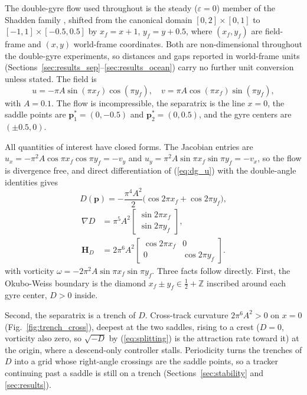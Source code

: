 \documentclass[lettersize,journal]{IEEEtran}
\begin{document}
The double-gyre flow used throughout is the steady ($\varepsilon = 0$)
member of the Shadden family \cite{15}, shifted from the canonical domain
$[0,2] \times [0,1]$ to $[-1,1] \times [-0.5, 0.5]$ by
$x_f = x + 1$, $y_f = y + 0.5$, where $(x_f, y_f)$ are field-frame and
$(x, y)$ world-frame coordinates. Both are non-dimensional throughout the
double-gyre experiments, so distances and gaps reported in world-frame
units (Sections~\ref{sec:results_sep}--\ref{sec:results_ocean}) carry no
further unit conversion unless stated. The field is
\begin{equation}
    u = -\pi A \sin(\pi x_f) \cos(\pi y_f), \quad
    v = \pi A \cos(\pi x_f) \sin(\pi y_f),
    \label{eq:dg_u}
\end{equation}
with $A = 0.1$. The flow is incompressible, the separatrix is the line
$x = 0$, the saddle points are $\mathbf{p}^*_1 = (0, -0.5)$ and
$\mathbf{p}^*_2 = (0, 0.5)$, and the gyre centers are $(\pm 0.5, 0)$.

All quantities of interest have closed forms. The Jacobian entries are
$u_x = -\pi^2 A \cos\pi x_f \cos\pi y_f = -v_y$ and
$u_y = \pi^2 A \sin\pi x_f \sin\pi y_f = -v_x$, so the flow is divergence
free, and direct differentiation of (\ref{eq:dg_u}) with the double-angle
identities gives
\begin{equation}
    D(\mathbf{p}) = -\frac{\pi^4 A^2}{2}
    \bigl(\cos 2\pi x_f + \cos 2\pi y_f\bigr),
    \label{eq:det_analytic_main}
\end{equation}
\begin{equation}
    \begin{aligned}
    \nabla D &= \pi^5 A^2
    \begin{bmatrix} \sin 2\pi x_f \\ \sin 2\pi y_f \end{bmatrix},
    \\
    \mathbf{H}_D &= 2\pi^6 A^2
    \begin{bmatrix} \cos 2\pi x_f & 0 \\ 0 & \cos 2\pi y_f \end{bmatrix}.
    \end{aligned}
    \label{eq:gradhess_analytic_main}
\end{equation}
with vorticity $\omega = -2\pi^2 A \sin\pi x_f \sin\pi y_f$. Three facts
follow directly. First, the Okubo-Weiss boundary is the diamond
$x_f \pm y_f \in \tfrac{1}{2} + \mathbb{Z}$ inscribed around each gyre
center, $D > 0$ inside.

Second, the separatrix is a trench of $D$. Cross-track curvature
$2\pi^6 A^2 > 0$ on $x = 0$ (Fig.~\ref{fig:trench_cross}), deepest at
the two saddles, rising to a crest ($D = 0$, vorticity also zero, so
$\sqrt{-D}$ by (\ref{eq:splitting}) is the attraction rate toward it)
at the origin, where a descend-only controller stalls. Periodicity
turns the trenches of $D$ into a grid whose right-angle crossings
are the saddle points, so a tracker continuing past a saddle is still
on a trench (Sections~\ref{sec:stability} and \ref{sec:results}).
\end{document}
